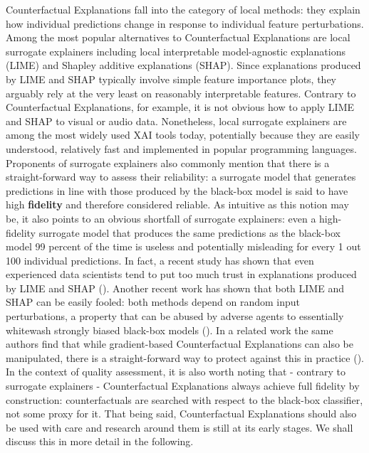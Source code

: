 \documentclass{juliacon}
\begin{document}
Counterfactual Explanations fall into the category of local methods:
they explain how individual predictions change in response to individual
feature perturbations. Among the most popular alternatives to
Counterfactual Explanations are local surrogate explainers including
local interpretable model-agnostic explanations (LIME) and Shapley
additive explanations (SHAP). Since explanations produced by LIME and
SHAP typically involve simple feature importance plots, they arguably
rely at the very least on reasonably interpretable features. Contrary to
Counterfactual Explanations, for example, it is not obvious how to apply
LIME and SHAP to visual or audio data. Nonetheless, local surrogate
explainers are among the most widely used XAI tools today, potentially
because they are easily understood, relatively fast and implemented in
popular programming languages. Proponents of surrogate explainers also
commonly mention that there is a straight-forward way to assess their
reliability: a surrogate model that generates predictions in line with
those produced by the black-box model is said to have high
\textbf{fidelity} and therefore considered reliable. As intuitive as
this notion may be, it also points to an obvious shortfall of surrogate
explainers: even a high-fidelity surrogate model that produces the same
predictions as the black-box model 99 percent of the time is useless and
potentially misleading for every 1 out 100 individual predictions. In
fact, a recent study has shown that even experienced data scientists
tend to put too much trust in explanations produced by LIME and SHAP
(\cite{kaur2020interpreting}). Another recent work has shown that both
LIME and SHAP can be easily fooled: both methods depend on random input
perturbations, a property that can be abused by adverse agents to
essentially whitewash strongly biased black-box models
(\cite{slack2020fooling}). In a related work the same authors find that
while gradient-based Counterfactual Explanations can also be
manipulated, there is a straight-forward way to protect against this in
practice (\cite{slack2021counterfactual}). In the context of quality
assessment, it is also worth noting that - contrary to surrogate
explainers - Counterfactual Explanations always achieve full fidelity by
construction: counterfactuals are searched with respect to the black-box
classifier, not some proxy for it. That being said, Counterfactual
Explanations should also be used with care and research around them is
still at its early stages. We shall discuss this in more detail in the
following.
\end{document}
